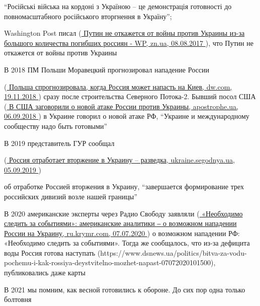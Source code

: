 \enquote{Російські війська на кордоні з Україною – це демонстрація готовності до
повномасштабного російського вторгнення в Україну}; 

Washington Post писал
(\href{https://zn.ua/UKRAINE/putin-ne-otkazhetsya-ot-voyny-protiv-ukrainy-iz-za-bolshogo-kolichestva-pogibshih-rossiyan-wp-256547_.html}{%
Путин не откажется от войны против Украины из-за большого количества погибших россиян - WP, %
zn.ua, 08.08.2017%
}),
что Путин не откажется от войны против Украины

В 2018 ПМ Польши Моравецкий прогнозировал нападение России

(\href{https://www.dw.com/ru/%D0%BF%D0%BE%D0%BB%D1%8C%D1%88%D0%B0-%D1%81%D0%BF%D1%80%D0%BE%D0%B3%D0%BD%D0%BE%D0%B7%D0%B8%D1%80%D0%BE%D0%B2%D0%B0%D0%BB%D0%B0-%D0%BA%D0%BE%D0%B3%D0%B4%D0%B0-%D1%80%D0%BE%D1%81%D1%81%D0%B8%D1%8F-%D0%BC%D0%BE%D0%B6%D0%B5%D1%82-%D0%BD%D0%B0%D0%BF%D0%B0%D1%81%D1%82%D1%8C-%D0%BD%D0%B0-%D0%BA%D0%B8%D0%B5%D0%B2/a-46351227}{%
Польша спрогнозировала, когда Россия может напасть на Киев, dw.com, 19.11.2018%
}
)
сразу после строительства Северного Потока-2. Бывший посол США
(\href{https://apostrophe.ua/news/society/accidents/2018-12-06/v-ssha-zagovorili-o-novoy-atake-rossii-protiv-ukrainyi/148030}{%
В США заговорили о новой атаке России против Украины, apostrophe.ua, 06.09.2018%
})
в Украине говорил о новой атаке РФ, \enquote{Украине и международному сообществу надо
быть готовыми}

В 2019 представитель ГУР сообщал

(\href{https://ukraine.segodnya.ua/ukraine/rossiya-otrabotaet-vtorzhenie-v-ukrainu-ukrainskaya-razvedka-1326694.html}{%
Россия отработает вторжение в Украину – разведка, ukraine.segodnya.ua, 05.09.2019%
})

об отработке Россией вторжения в Украину, \enquote{завершается формирование трех
российских дивизий возле нашей границы}

В 2020 американские эксперты через Радио Свободу заявляли
(\href{https://ru.krymr.com/a/analitiki-ssha-o-vozmozhnom-napadenii-rossii-na-ukrainu/30711677.html}{%
«Необходимо следить за событиями»: американские аналитики ‒ о возможном нападении России на Украину, %
ru.krymr.com, 07.07.2020%
})
о возможном нападении РФ: «Необходимо следить за событиями». Тогда же сообщалось,
что из-за дефицита воды Россия готова наступать
(https://www.dsnews.ua/politics/bitva-za-vodu-pochemu-i-kak-rossiya-deystvitelno-mozhet-napast-07072020101500),
публиковались даже карты

В 2021 мы помним, как весной готовились к обороне. До сих пор одна только
болтовня


